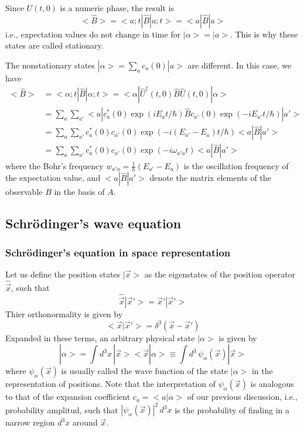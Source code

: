 Since $U(t,0)$ is a numeric phase, the result is
\begin{equation}
  <\hat{B}> = <a;t|\hat{B}|a;t> = <a|\hat{B}|a>
  \label{equ:2.26}
\end{equation}
i.e., expectation values do not change in time for $|\alpha>
= |a>$. This is why these states are called stationary.

The nonstationary states $|\alpha> = \sum_a c_a(0) |a>$ are
different. In this case, we have
\begin{align*}
  <\hat{B}> &= <\alpha;t|\hat{B}|\alpha;t> =
  <\alpha|\hat{U}^{\dagger}(t,0)
  \hat{B}\hat{U}(t,0)|\alpha>\\
  &=
  \sum_a \sum_{a'} <a|c^*_a(0) \exp(i E_a t/\hbar)
  \hat{B}c_{a'}(0)\exp(-i E_{a'} t/\hbar)|a'>\\
  &=
  \sum_a \sum_{a'} c_a^*(0) c_{a'}(0) \exp(-i (E_{a'}-E_a)t/
  \hbar) <a|\hat{B}|a'>\\
  &=
  \sum_a \sum_{a'} c_a^*(0) c_{a'}(0) \exp(-i \omega_{a' a}t)
  <a|\hat{B}|a'>
\end{align*}
where the Bohr's frequency $w_{a'a} =
\frac{1}{\hbar}(E_{a'}-E_a)$ is the oscillation frequency of
the expectation value, and $<a|\hat{B}|a'>$ denote the
matrix elements of the observable $B$ in the basis of $A$.

\subsection{Schrödinger's wave equation}
\subsubsection{Schrödinger's equation in space
representation}
Let us define the position states $|\vec{x}>$ as the
eigenstates of the position operator $\hat{\vec{x}}$, such
that
\begin{equation}
  \hat{\vec{x}} |\vec{x}'> = \vec{x}'|\vec{x}'>
  \label{equ:2.28}
\end{equation}
Thier orthonormality is given by
\begin{equation}
  <\vec{x}|\vec{x}'> = \delta^3(\vec{x}-\vec{x}')
  \label{equ:2.29}
\end{equation}
Expanded in these terms, an arbitrary physical state
$|\alpha>$ is given by
$$
  |\alpha> = \int d^3 x \, |\vec{x}><\vec{x}|\alpha> \equiv
  \int d^3 \, \psi_{\alpha}(\vec{x}) |\vec{x}>
$$
where $\psi_{\alpha}(\vec{x})$ is usually called the wave
function of the state $|\alpha>$ in the representation of
positions. Note that the interpretation of
$\psi_{\alpha}(\vec{x})$ is analogous to that of the
expansion coefficient $c_a = <a|\alpha>$ of our previous
discussion, i.e., probability amplitud, such that
$|\psi_{\alpha}(\vec{x})|^2\, d^3x$ is the probability of
finding in a narrow region $d^3 x$ around $\vec{x}$.

